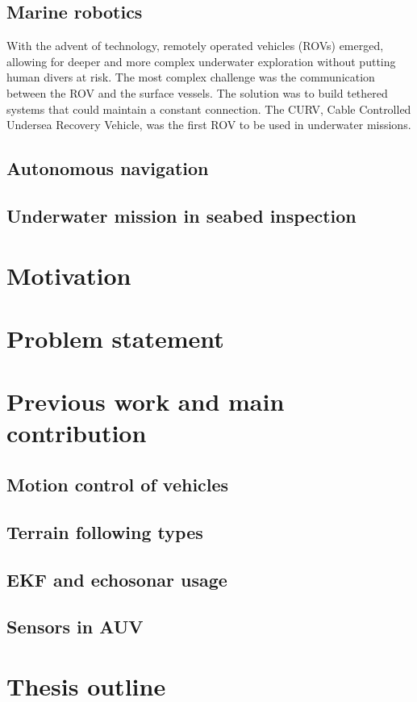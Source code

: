 \subsection{Marine robotics}
With the advent of technology, remotely operated vehicles (ROVs) emerged, allowing for deeper and more complex underwater exploration without putting human divers at risk. The most complex challenge was the communication between the ROV and the surface vessels. The solution was to build tethered systems that could maintain a constant connection.
The CURV, Cable Controlled Undersea Recovery Vehicle, was the first ROV to be used in underwater missions.


\subsection{Autonomous navigation}
\subsection{Underwater mission in seabed inspection}

\section{Motivation}
\section{Problem statement}

\section{Previous work and main contribution}
\subsection{Motion control of vehicles}
\subsection{Terrain following types} 
\subsection{EKF and echosonar usage}
\subsection{Sensors in AUV}

\section{Thesis outline}